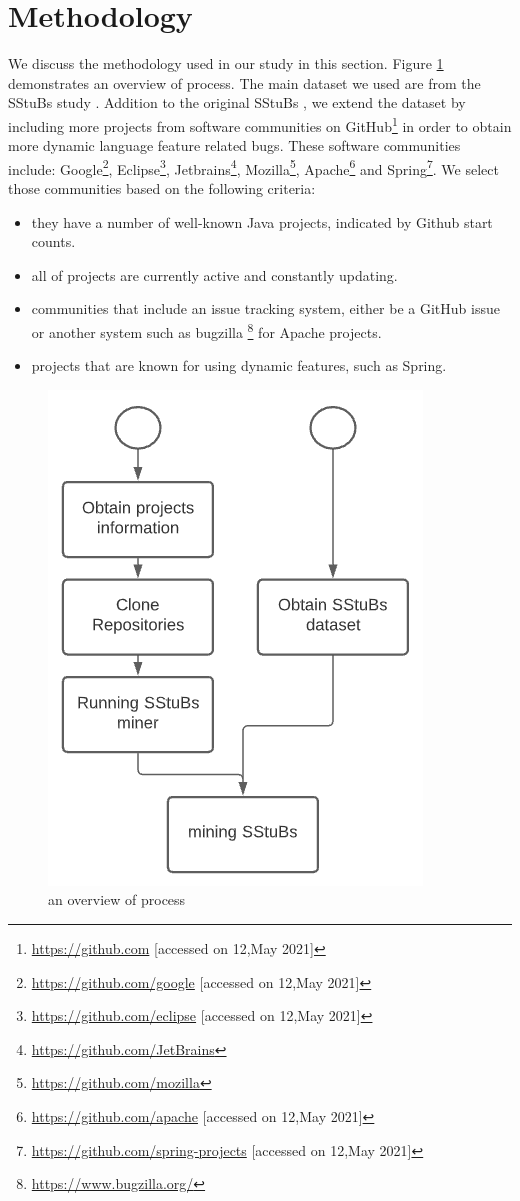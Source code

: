 \documentclass[sigconf,review,anonymous]{acmart}
\begin{document}
\section{Methodology}
We discuss the methodology used in our study in this section. Figure \ref{fig:process} demonstrates an overview of process. The main dataset we used are from the SStuBs study \cite{karampatsis2020often}. Addition to the original SStuBs \cite{karampatsis2020often}, we extend the dataset by including more projects from software communities on GitHub\footnote{\url{https://github.com} [accessed on 12,May 2021]} in order to obtain more dynamic language feature related bugs. These software communities include: Google\footnote{\url{https://github.com/google} [accessed on 12,May 2021]}, Eclipse\footnote{\url{https://github.com/eclipse} [accessed on 12,May 2021]}, Jetbrains\footnote{\url{https://github.com/JetBrains}}, Mozilla\footnote{\url{https://github.com/mozilla}}, Apache\footnote{\url{https://github.com/apache} [accessed on 12,May 2021]} and Spring\footnote{\url{https://github.com/spring-projects} [accessed on 12,May 2021]}. We select those communities based on the following criteria: 

\begin{itemize}
\item they have a number of well-known Java projects, indicated by Github start counts.
\item all of projects are currently active and constantly updating.
\item communities that include an issue tracking system, either be a GitHub issue or another system such as bugzilla \footnote{\url{https://www.bugzilla.org/}} for Apache projects.
\item projects that are known for using dynamic features, such as Spring.
\end{itemize}

\begin{figure}[H]
  \centering
      \includegraphics[width=0.7\columnwidth]{figures/process.png}
  \caption{an overview of process}
  \label{fig:process}
\end{figure}
\end{document}

